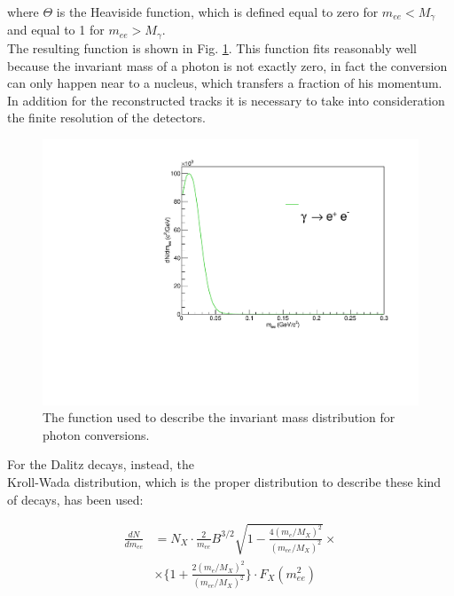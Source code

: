 \documentclass[a4paper,twocolumn,gsifonts,twoside]{gsipaper}
\begin{document}
where $\Theta$ is the Heaviside function, which is defined equal to zero for $m_{ee} < M_{\gamma}$ and equal to 1 for 
$m_{ee} > M_{\gamma}$.\\

The resulting function is shown in Fig. \ref{photon_conversions}.
This function fits reasonably well because the invariant mass of a photon is not exactly zero, in fact the conversion can only happen
near to a nucleus, which transfers a fraction of his momentum. In addition for the reconstructed tracks it is necessary to take into 
consideration the finite resolution of the detectors.\\

\begin{figure}[htb]
\begin{center}
\advance\leftskip-0.5cm
\includegraphics[scale = 0.4]{gamma_temp.pdf}
\caption{The function used to describe the invariant mass distribution for photon conversions.}
\label{photon_conversions}
\end{center}
\end{figure}

For the Dalitz decays, instead, the \\Kroll-Wada distribution, which is the proper distribution to describe these kind
of decays, has been used:

\vspace{0.2cm}
\begin{equation}
\begin{split}
\frac{dN}{dm_{ee}} &=N_{X}\cdot\frac{2}{m_{ee}}B^{3/2}\sqrt{1-\frac{4(m_{e}/M_{X})^{2}}{(m_{ee}/M_{X})^{2}}}\times \\
&\times \Bigg\{1+\frac{2(m_{e}/M_{X})^{2}}{(m_{ee}/M_{X})^{2}}\Bigg\}\cdot F_{X}(m_{ee}^2) 
\label{kroll_wada}
\end{split}
\end{equation}
\vspace{0.2cm}
\end{document}
